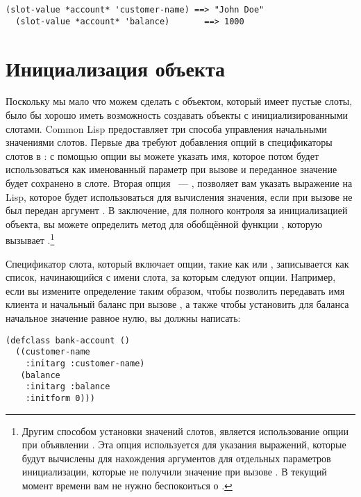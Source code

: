 \begin{lstlisting}[style=lisprepl]
  (slot-value *account* 'customer-name) ==> "John Doe"
  (slot-value *account* 'balance)       ==> 1000
\end{lstlisting}

\section{Инициализация объекта}

Поскольку мы мало что можем сделать с объектом, который имеет пустые слоты, было бы хорошо
иметь возможность создавать объекты с инициализированными слотами.  Common Lisp
предоставляет три способа управления начальными значениями слотов.  Первые два требуют
добавления опций в спецификаторы слотов в : с помощью опции 
вы можете указать имя, которое потом будет использоваться как именованный параметр при
вызове  и переданное значение будет сохранено в слоте.  Вторая опция
~--- , позволяет вам указать выражение на Lisp, которое будет использоваться
для вычисления значения, если при вызове  не был передан аргумент
 .  В заключение, для полного контроля за инициализацией объекта, вы можете
определить метод для обобщённой функции , которую вызывает
.\footnote{Другим способом установки значений слотов, является
  использование опции  при объявлении .  Эта опция
  используется для указания выражений, которые будут вычислены для нахождения аргументов
  для отдельных параметров инициализации, которые не получили значение при вызове
  .  В текущий момент времени вам не нужно беспокоиться о
  .}

Спецификатор слота, который включает опции, такие как  или
, записывается как список, начинающийся с имени слота, за которым следуют
опции.  Например, если вы измените определение  таким образом, чтобы
позволить передавать имя клиента и начальный баланс при вызове , а
также чтобы установить для баланса начальное значение равное нулю, вы должны написать:

\begin{lstlisting}
(defclass bank-account ()
  ((customer-name
    :initarg :customer-name)
   (balance
    :initarg :balance
    :initform 0)))
\end{lstlisting}

